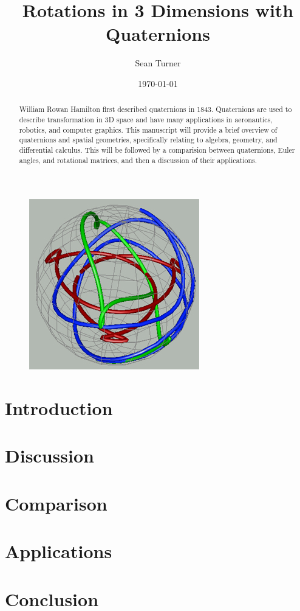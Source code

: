 \documentclass{article}
\theoremstyle{definition}
\begin{document}
\title{Rotations in 3 Dimensions with Quaternions}
\date{\today}
\author{Sean Turner}
\maketitle

\begin{figure}[H]
\centering
\includegraphics[width = .65\textwidth]{Figures/quaternion_map}
\end{figure}

\newpage
{}
\tableofcontents
\listoffigures
\newpage
{}
\begin{abstract}
\noindent William Rowan Hamilton first described quaternions in 1843.
Quaternions are used to describe transformation in 3D space and have many applications in aeronautics, robotics, and computer graphics.
This manuscript will provide a brief overview of quaternions and spatial geometries, specifically relating to algebra, geometry, and differential calculus.
This will be followed by a comparision between quaternions, Euler angles, and rotational matrices, and then a discussion of their applications.
\end{abstract}

\section{Introduction}


\section{Discussion}
\label{sec:disc}


\section{Comparison}
\label{sec:comp}


\section{Applications}
\label{sec:app}


\section{Conclusion}
\label{sec:conc}


\newpage


\end{document}
